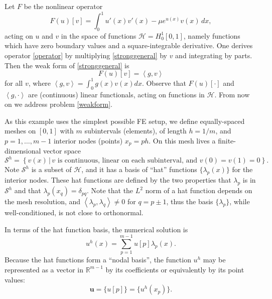 \documentclass[letterpaper,final,12pt,reqno]{amsart}
\newcommand{\RR}{\mathbb{R}}
\newcommand{\bu}{\mathbf{u}}
\newcommand{\ip}[2]{\left<#1,#2\right>}
\begin{document}
Let $F$ be the nonlinear operator
\begin{equation}
  F(u)[v] = \int_0^1 u'(x) v'(x) - \mu e^{u(x)} v(x)\, dx,  \label{operator}
\end{equation}
acting on $u$ and $v$ in the space of functions $\mathcal{H}=H_0^1[0,1]$, namely functions which have zero boundary values and a square-integrable derivative.  One derives operator \eqref{operator} by multiplying \eqref{stronggeneral} by $v$ and integrating by parts.  Then the weak form of \eqref{stronggeneral} is
\begin{equation}
  F(u)[v] = \ip{g}{v} \label{weakform}
\end{equation}
for all $v$, where $\ip{g}{v} = \int_0^1 g(x) v(x) dx$.  Observe that $F(u)[\cdot]$ and $\ip{g}{\cdot}$ are (continuous) linear functionals, acting on functions in $\mathcal{H}$.  From now on we address problem \eqref{weakform}.

As this example uses the simplest possible FE setup, we define equally-spaced meshes on $[0,1]$ with $m$ subintervals (elements), of length $h=1/m$, and $p=1,\dots,m-1$ interior nodes (points) $x_p=ph$.  On this mesh lives a finite-dimensional vector space
\begin{equation}
\mathcal{S}^h = \left\{v(x)\,\big|\,v \text{ is continuous, linear on each subinterval, and } v(0)=v(1)=0\right\}.  \label{fespace}
\end{equation}
Note $\mathcal{S}^h$ is a subset of $\mathcal{H}$, and it has a basis of ``hat'' functions $\{\lambda_p(x)\}$ for the interior nodes.  These hat functions are defined by the two properties that $\lambda_p$ is in $\mathcal{S}^h$ and that $\lambda_p(x_q)=\delta_{pq}$.  Note that the $L^2$ norm of a hat function depends on the mesh resolution, and $\ip{\lambda_p}{\lambda_q}\ne 0$ for $q=p\pm1$, thus the basis $\{\lambda_p\}$, while well-conditioned, is not close to orthonormal.

In terms of the hat function basis, the numerical solution is
\begin{equation}
  u^h(x) = \sum_{p=1}^{m-1} u[p] \lambda_p(x).  \label{fesolution}
\end{equation}
Because the hat functions form a ``nodal basis'', the function $u^h$ may be represented as a vector in $\RR^{m-1}$ by its coefficients or equivalently by its point values:
\begin{equation}
\bu =\{u[p]\} = \{u^h(x_p)\}.  \label{fevector}
\end{equation}
\end{document}
